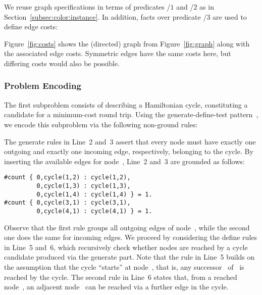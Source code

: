 We reuse graph specifications in terms of predicates /$1$ and /$2$
as in Section~\ref{subsec:color:instance}.
In addition, facts over predicate /$3$ are used to define edge costs:
%

%
Figure~\ref{fig:costs} shows the (directed) graph from Figure~\ref{fig:graph}
along with the associated edge costs.
Symmetric edges have the same costs here,
but differing costs would also be possible.


\subsubsection{Problem Encoding}\label{subsec:tsp:encoding}

The first subproblem consists of describing a Hamiltonian cycle,
constituting a candidate for a minimum-cost round trip.
Using the generate-define-test pattern~\cite{lifschitz02a},
we encode this subproblem via the following non-ground rules:
%

%
The generate rules in Line~2 and~3 assert that every node must have
exactly one outgoing and exactly one incoming edge, respectively,
belonging to the cycle.
By inserting the available edges for node~,
Line~2 and~3 are grounded as follows:%
%
\begin{lstlisting}[numbers=none]
#count { 0,cycle(1,2) : cycle(1,2),
         0,cycle(1,3) : cycle(1,3),
         0,cycle(1,4) : cycle(1,4) } = 1.
#count { 0,cycle(3,1) : cycle(3,1), 
         0,cycle(4,1) : cycle(4,1) } = 1.
\end{lstlisting}
%
Observe that the first rule groups all outgoing edges of node~,
while the second one does the same for incoming edges.
We proceed by considering the define rules in Line~5 and~6,
which recursively check whether nodes are reached by a cycle candidate
produced via the generate part.
Note that the rule in Line~5 builds on the assumption that the cycle
``starts'' at node~, that is,
any successor~ of~ is reached by the cycle.
The second rule in Line~6 states that, from a reached node~,
an adjacent node~ can be reached via a further edge in the cycle.
